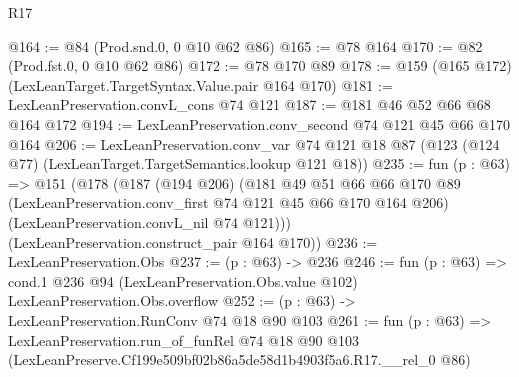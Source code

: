 \begin{lexlean}{R17}
\begin{coremodule}
@164 := @84 (Prod.snd.{0, 0} @10 @62 @86)
@165 := @78 @164
@170 := @82 (Prod.fst.{0, 0} @10 @62 @86)
@172 := @78 @170 @89
@178 := @159 (@165 @172) (LexLeanTarget.TargetSyntax.Value.pair @164 @170)
@181 := LexLeanPreservation.convL_cons @74 @121
@187 := @181 @46 @52 @66 @68 @164 @172
@194 := LexLeanPreservation.conv_second @74 @121 @45 @66 @170 @164
@206 := LexLeanPreservation.conv_var
    @74
    @121
    @18
    @87
    (@123 (@124 @77) (LexLeanTarget.TargetSemantics.lookup @121 @18))
@235 := fun (p : @63) =>
  @151
    (@178
      (@187
        (@194 @206)
        (@181
          @49
          @51
          @66
          @66
          @170
          @89
          (LexLeanPreservation.conv_first @74 @121 @45 @66 @170 @164 @206)
          (LexLeanPreservation.convL_nil @74 @121)))
      (LexLeanPreservation.construct_pair @164 @170))
@236 := LexLeanPreservation.Obs
@237 := (p : @63) -> @236
@246 := fun (p : @63) =>
  cond.{1} @236 @94 (LexLeanPreservation.Obs.value @102) LexLeanPreservation.Obs.overflow
@252 := (p : @63) -> LexLeanPreservation.RunConv @74 @18 @90 @103
@261 := fun (p : @63) =>
  LexLeanPreservation.run_of_funRel
    @74
    @18
    @90
    @103
    (LexLeanPreserve.Cf199e509bf02b86a5de58d1b4903f5a6.R17.__rel_0 @86)
\end{coremodule}
\end{lexlean}
